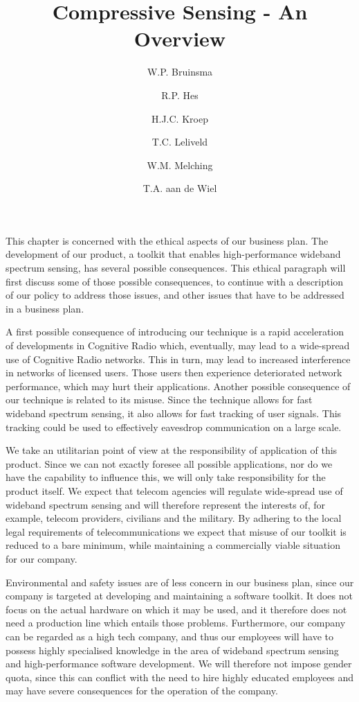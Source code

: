 \documentclass[a4paper, openany, oneside]{memoir}
\title{Compressive Sensing - An Overview}
\author{W.P. Bruinsma \and R.P. Hes \and H.J.C. Kroep \and T.C. Leliveld \and W.M. Melching \and T.A. aan de Wiel}
\begin{document}
This chapter is concerned with the ethical aspects of our business plan. The development of our product, a toolkit that enables high-performance wideband spectrum sensing, has several possible consequences. This ethical paragraph will first discuss some of those possible consequences, to continue with a description of our policy to address  those issues, and other issues that have to be addressed in a business plan. 

A first possible consequence of introducing our technique is a rapid acceleration of developments in Cognitive Radio which, eventually,
may lead to a wide-spread use of Cognitive Radio networks. This in turn, may lead to increased interference in networks of licensed users. Those users then experience deteriorated network performance, which may hurt their applications. Another possible consequence of our technique is related to its misuse. Since the technique allows for fast wideband spectrum sensing, it also allows for fast tracking of user signals. This tracking could be used to effectively eavesdrop communication on a large scale.

We take an utilitarian point of view at the responsibility of application of this product. Since we can not exactly foresee all possible applications, nor do we have the capability to influence this, we will only take responsibility for the product itself. We expect that telecom agencies will regulate wide-spread use of wideband spectrum sensing and will therefore represent the interests of, for example, telecom providers, civilians and the military. By adhering to the local legal requirements of telecommunications we expect that misuse of our toolkit is reduced to a bare minimum, while maintaining a commercially viable situation for our company.

Environmental and safety issues are of less concern in our business plan, since our company is targeted at developing and maintaining a software toolkit. It does not focus on the actual hardware on which it may be used, and it therefore does not need a production line which entails those problems. Furthermore, our company can be regarded as a high tech company, and thus our employees will have to possess highly specialised knowledge in the area of wideband spectrum sensing and high-performance software development. We will therefore not impose gender quota, since this can conflict with the need to hire highly educated employees and may have severe consequences for the operation of the company. 
\end{document}

